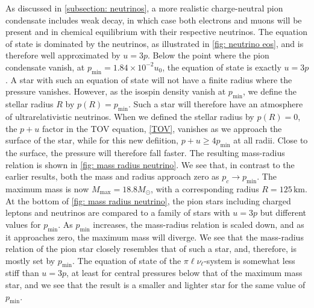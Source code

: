 As discussed in \autoref{subsection: neutrinos}, a more realistic charge-neutral pion condensate includes weak decay, in which case both electrons and muons will be present and in chemical equilibrium with their respective neutrinos.
The equation of state is dominated by the neutrinos, as illustrated in \autoref{fig: neutrino eos}, and is therefore well approximated by $u = 3p$.
Below the point where the pion condensate vanish, at $p_\text{min} = 1.84 \times 10^{-2} u_0$, the equation of state is exactly $u = 3p$.
A star with such an equation of state will not have a finite radius where the pressure vanishes.
However, as the isospin density vanish at $p_\text{min}$, we define the stellar radius $R$ by $p(R) = p_\text{min}$.
Such a star will therefore have an atmosphere of ultrarelativistic neutrinos.
When we defined the stellar radius by $p(R) = 0$, the $p+u$ factor in the TOV equation, \autoref{TOV}, vanishes as we approach the surface of the star, while for this new defiition, $p+u \geq 4 p_\text{min}$ at all radii.
Close to the surface, the pressure will therefore fall faster.
The resulting mass-radius relation is shown in \autoref{fig: mass radius neutrino}.
We see that, in contrast to the earlier results, both the mass and radius approach zero as $p_c \rightarrow p_\text{min}$.
The maximum mass is now $M_\text{max} = 18.8 M_\odot$, with a corresponding radius $R = 125 \, \text{km}$.
At the bottom of \autoref{fig: mass radius neutrino}, the pion stars including charged leptons and neutrinos are compared to a family of stars with $u = 3p$ but different values for $p_\text{min}$.
As $p_\text{min}$ increases, the mass-radius relation is scaled down, and as it approaches zero, the maximum mass will diverge.
We see that the mass-radius relation of the pion star closely resembles that of such a star, and, therefore, is mostly set by $p_\text{min}$.
The equation of state of the $\pi\ell\nu_\ell$-system is somewhat less stiff than $u = 3p$, at least for central pressures below that of the maximum mass star, and we see that the result is a smaller and lighter star for the same value of $p_\text{min}$.


